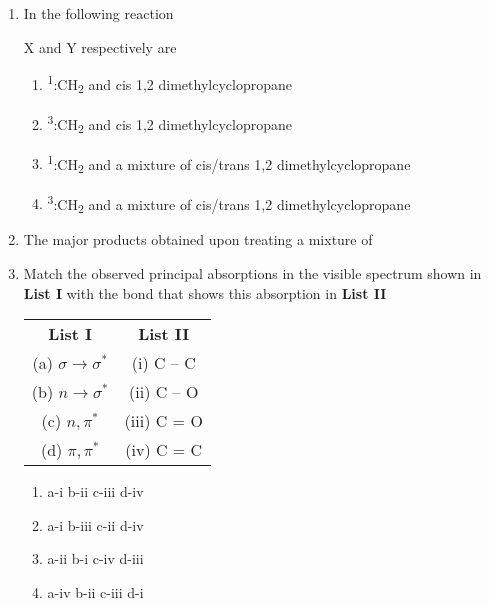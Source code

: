 \documentclass[journal,12pt,onecolumn]{IEEEtran}
\theoremstyle{remark}
\begin{document}
\begin{enumerate}
 

\item  In the following reaction \hfill{}




X and Y respectively are

\begin{multicols}{2}
\begin{enumerate}
     \item   \textsuperscript{1}:CH\textsubscript{2} and cis 1,2 dimethylcyclopropane
     \item   \textsuperscript{3}:CH\textsubscript{2} and cis 1,2 dimethylcyclopropane
     \item   \textsuperscript{1}:CH\textsubscript{2} and a mixture of cis/trans 1,2 dimethylcyclopropane
     \item   \textsuperscript{3}:CH\textsubscript{2} and a mixture of cis/trans 1,2 dimethylcyclopropane
\end{enumerate}
\end{multicols}

\item  The major products obtained upon treating a mixture of \hfill{}


   

\item  Match the observed principal absorptions in the visible spectrum shown in \textbf{List I} with the bond that shows this absorption in \textbf{List II} \hfill{}

\begin{center}
\begin{tabular}{c@{\hspace{3cm}}c}
\textbf{List I} & \textbf{List II} \\
(a) $\sigma \rightarrow \sigma^*$ & (i) C -- C \\
(b) $n \rightarrow \sigma^*$ & (ii) C -- O \\
(c) $n, \pi^*$ & (iii) C = O \\
(d) $\pi, \pi^*$ & (iv) C = C \\
\end{tabular}
\end{center}

\begin{multicols}{2}
\begin{enumerate}
     \item   a-i \quad b-ii \quad c-iii \quad d-iv
     \item   a-i \quad b-iii \quad c-ii \quad d-iv
     \item   a-ii \quad b-i \quad c-iv \quad d-iii
     \item   a-iv \quad b-ii \quad c-iii \quad d-i
\end{enumerate}
\end{multicols}
   


\end{enumerate}
\end{document}
